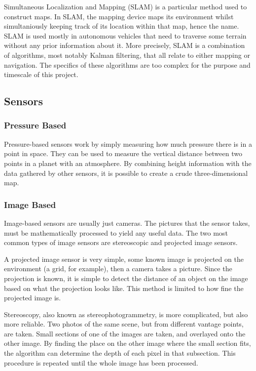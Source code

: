 Simultaneous Localization and Mapping (SLAM) is a particular method used to construct maps. In SLAM, the mapping device maps its environment whilst simultaniously keeping track of its location within that map, hence the name. SLAM is used mostly in autonomous vehicles that need to traverse some terrain without any prior information about it. More precisely, SLAM is a combination of algorithms, most notably Kalman filtering, that all relate to either mapping or navigation. The specifics of these algorithms are too complex for the purpose and timescale of this project.

\subsection{Sensors}
\subsubsection{Pressure Based}
Pressure-based sensors work by simply measuring how much pressure there is in a point in space. They can be used to measure the vertical distance between two points in a planet with an atmosphere\cite{barometric1}\cite{barometric2}. By combining height information with the data gathered by other sensors, it is possible to create a crude three-dimensional map.

\subsubsection{Image Based}
Image-based sensors are usually just cameras. %
 The pictures that the sensor takes, must be mathematically processed to yield any useful data. The two most common types of image sensors are stereoscopic and projected image sensors.

A projected image sensor is very simple, %
 some known image is projected on the environment (a grid, for example), then a camera takes a picture. Since the projection is known, it is simple to detect the distance of an object on the image based on what the projection looks like. This method is limited to how fine the projected image is. %

Stereoscopy, also known as stereophotogrammetry, is more complicated, but also more reliable. Two photos of the same scene, but from different vantage points, are taken. Small sections of one of the images are taken, and overlayed onto the other image. By finding the place on the other image where the small section fits, the algorithm can determine the depth of each pixel in that subsection. This procedure is repeated until the whole image has been processed.

